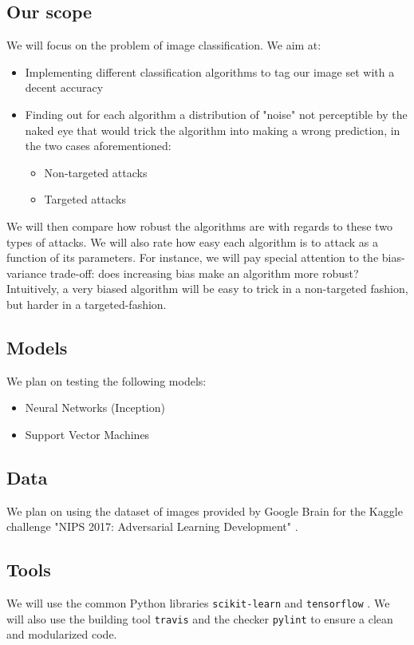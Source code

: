 \documentclass{article}
\begin{document}
\newpage
\subsection{Our scope}
We will focus on the problem of image classification.
We aim at:

\begin{itemize}
    \item Implementing different classification algorithms to tag our image set with a decent accuracy
    \item Finding out for each algorithm a distribution of "noise" not perceptible by the naked eye that would trick the algorithm into making a wrong prediction, in the two cases aforementioned:
    \begin{itemize}
        \item Non-targeted attacks
        \item Targeted attacks
    \end{itemize}
\end{itemize}

We will then compare how robust the algorithms are with regards to these two types of attacks. We will also rate how easy each algorithm is to attack as a function of its parameters. For instance, we will pay special attention to the bias-variance trade-off: does increasing bias make an algorithm more robust? Intuitively, a very biased algorithm will be easy to trick in a non-targeted fashion, but harder in a targeted-fashion.
\subsection{Models}
We plan on testing the following models:

\begin{itemize}
    \item Neural Networks (Inception)
    \item Support Vector Machines
\end{itemize}

\subsection{Data}
We plan on using the dataset of images provided by Google Brain for the Kaggle challenge "NIPS 2017: Adversarial Learning Development" \cite{a2}.

\subsection{Tools}
We will use the common Python libraries \texttt{scikit-learn} and \texttt{tensorflow} \cite{tensorflow}. We will also use the building tool \texttt{travis} and the checker \texttt{pylint} to ensure a clean and modularized code.
\end{document}
